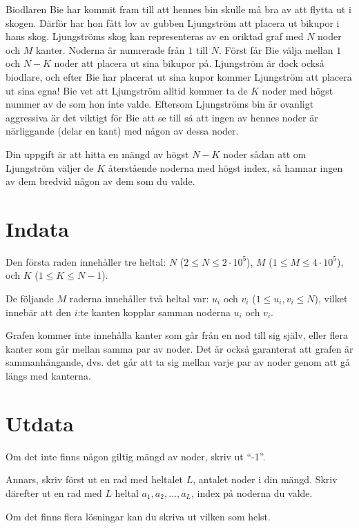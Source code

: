 


Biodlaren Bie har kommit fram till att hennes bin skulle må bra av att flytta ut i skogen. 
Därför har hon fått lov av gubben Ljungström att placera ut bikupor i hans skog.
Ljungströms skog kan representeras av en oriktad graf med $N$ noder och $M$ kanter. 
Noderna är numrerade från $1$ till $N$. Först får Bie välja mellan $1$ och $N-K$ noder 
att placera ut sina bikupor på. Ljungström är dock också biodlare, och efter Bie har placerat ut sina kupor kommer Ljungström att placera ut sina egna!
Bie vet att Ljungström alltid kommer ta de $K$ noder med högst nummer av de som hon 
inte valde. Eftersom Ljungströms bin är ovanligt aggressiva är det viktigt för Bie att 
se till så att ingen av hennes noder är närliggande (delar en kant) med någon av dessa noder.

Din uppgift är att hitta en mängd av högst $N-K$ noder sådan att om Ljungström väljer de
$K$ återstående noderna med högst index, så hamnar ingen av dem bredvid någon av dem som du valde.


\section*{Indata}
Den första raden innehåller tre heltal: $N$ ($2 \le N \le 2 \cdot 10^5$), 
$M$ ($1 \leq M \leq 4\cdot 10^5$), och $K$ ($1 \leq K \leq N-1$).

De följande $M$ raderna innehåller två heltal var: $u_i$ och $v_i$ ($1 \leq u_i, v_i \leq N$),
vilket innebär att den $i$:te kanten kopplar samman noderna $u_i$ och $v_i$.

Grafen kommer inte innehålla kanter som går från en nod till sig själv, eller flera kanter som 
går mellan samma par av noder. Det är också garanterat att grafen är sammanhängande, dvs. det går
att ta sig mellan varje par av noder genom att gå längs med kanterna.

\section*{Utdata}
Om det inte finns någon giltig mängd av noder, skriv ut ``-1''.

Annars, skriv först ut en rad med heltalet $L$, antalet noder i din mängd.
Skriv därefter ut en rad med $L$ heltal $a_1, a_2, \dots , a_L$, index på noderna
du valde.

Om det finns flera lösningar kan du skriva ut vilken som helst.

